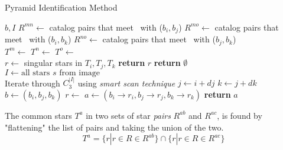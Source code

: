 \begin{algorithm}
    \caption{Pyramid Identification Method} \label{algorithm:pyramidIdentification}
    \begin{algorithmic}[1]
         {$b, I$}
        \State $R^{mn} \gets$ catalog pairs that meet~ with ($b_i, b_j$)
        \State $R^{mo} \gets$ catalog pairs that meet~ with ($b_i, b_k$)
        \State $R^{no} \gets$ catalog pairs that meet~ with ($b_j, b_k$)
        \\
        \State $T^m \gets $ 
        \State $T^n \gets $ 
        \State $T^o \gets $ 
        \\
        \State $r \gets $ singular stars in $T_i, T_j, T_k$
        \State \textbf{return} $r$
        \EndIf
        \EndIf
        \State \textbf{return} $\emptyset$
        \EndFunction
        \\
        \State $I \gets \text{all stars } s \text{ from image}$
        \\
        \LineComment Iterate through $C^{|I|}_3$ using \textit{smart scan technique}
        \State $j \gets i + dj$
        \State $k \gets j + dk$
        \\
        \State $b \gets (b_i, b_j, b_k)$
        \State $r \gets$ 
        \State $a \gets (b_i \rightarrow r_i, b_j \rightarrow r_j, b_k \rightarrow r_k)$
        \State \textbf{return} $a$
        \EndIf
        \EndFor
        \EndFor
        \EndFor
        \EndProcedure
    \end{algorithmic}
\end{algorithm}

The common stars $T^a$ in two sets of star \textit{pairs} $R^{ab}$ and $R^{ac}$, is found by "flattening" the list of
pairs and taking the union of the two.
\begin{equation}
    \label{eq:commonStarsPyramid}
    T^a = \{ r | r \in R \in R^{ab} \} \cap \{ r | r \in R \in R^{ac} \}
\end{equation}


